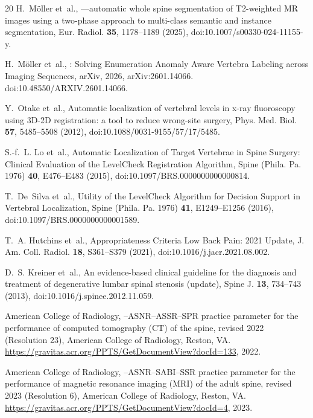 \documentclass[aapm,mph,amsmath,amssymb,preprint,linenumbers]{revtex4-2}
\begin{document}
\begin{thebibliography}{20}
H.~M{\"o}ller et~al.,
—automatic whole spine segmentation of {T2}-weighted {MR} images using a two-phase approach to multi-class semantic and instance segmentation,
\newblock Eur. Radiol. {\bf 35}, 1178--1189 (2025),
\newblock doi:10.1007/s00330-024-11155-y.

H.~M{\"o}ller et~al.,
: Solving Enumeration Anomaly Aware Vertebra Labeling across Imaging Sequences,
\newblock arXiv, 2026,
\newblock arXiv:2601.14066. doi:10.48550/ARXIV.2601.14066.

Y.~Otake et~al.,
\newblock Automatic localization of vertebral levels in x-ray fluoroscopy using {3D-2D} registration: a tool to reduce wrong-site surgery,
\newblock Phys. Med. Biol. {\bf 57}, 5485--5508 (2012),
\newblock doi:10.1088/0031-9155/57/17/5485.

S.-f.~L. Lo et~al.,
\newblock Automatic Localization of Target Vertebrae in Spine Surgery: Clinical Evaluation of the {LevelCheck} Registration Algorithm,
\newblock Spine (Phila. Pa. 1976) {\bf 40}, E476--E483 (2015),
\newblock doi:10.1097/BRS.0000000000000814.

T.~De~Silva et~al.,
\newblock Utility of the {LevelCheck} Algorithm for Decision Support in Vertebral Localization,
\newblock Spine (Phila. Pa. 1976) {\bf 41}, E1249--E1256 (2016),
\newblock doi:10.1097/BRS.0000000000001589.

T.~A. Hutchins et~al.,
 {Appropriateness Criteria} Low Back Pain: 2021 Update,
\newblock J. Am. Coll. Radiol. {\bf 18}, S361--S379 (2021),
\newblock doi:10.1016/j.jacr.2021.08.002.

D.~S. Kreiner et~al.,
\newblock An evidence-based clinical guideline for the diagnosis and treatment of degenerative lumbar spinal stenosis (update),
\newblock Spine J. {\bf 13}, 734--743 (2013),
\newblock doi:10.1016/j.spinee.2012.11.059.

{American College of Radiology},
--{ASNR}--{ASSR}--{SPR} practice parameter for the performance of computed tomography ({CT}) of the spine, revised 2022 ({Resolution} 23),
\newblock American College of Radiology, Reston, VA. \url{https://gravitas.acr.org/PPTS/GetDocumentView?docId=133}, 2022.

{American College of Radiology},
--{ASNR}--{SABI}--{SSR} practice parameter for the performance of magnetic resonance imaging ({MRI}) of the adult spine, revised 2023 ({Resolution} 6),
\newblock American College of Radiology, Reston, VA. \url{https://gravitas.acr.org/PPTS/GetDocumentView?docId=4}, 2023.


\end{thebibliography}
\end{document}
